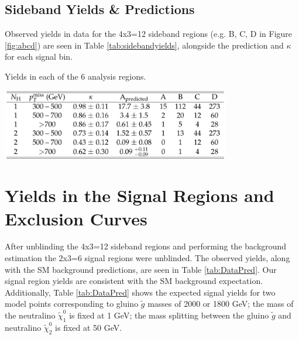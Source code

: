 \subsection{Sideband Yields \& Predictions}

Observed yields in data for the 4x3=12 sideband regions (e.g. B, C, D in Figure \ref{fig:abcd}) are seen in Table \ref{tab:sidebandyields}, alongside the prediction and $\kappa$ for each signal bin.

\begin{table}[htbp]
\centering
\caption{Yields in each of the 6 analysis regions.}
\includegraphics[width=0.75\textwidth]{figs/SUS17006/CMS-SUS-17-006_Table-aux_001.pdf}
\label{tab:sidebandyields}
\end{table}



\section{Yields in the Signal Regions and Exclusion Curves}
\label{sec:results}

After unblinding the 4x3=12 sideband regions and performing the background estimation the 2x3=6 signal regions were unblinded. The observed yields, along with the SM background predictions, are seen in Table \ref{tab:DataPred}. Our signal region yields are consistent with the SM background expectation. Additionally, Table \ref{tab:DataPred} shows the expected signal yields for two model points corresponding to gluino $\tilde{g}$ masses of 2000 or 1800 GeV; the mass of the neutralino $\tilde{\chi}_{1}^{0}$ is fixed at 1 GeV; the mass splitting between the gluino $\tilde{g}$ and neutralino $\tilde{\chi}_{2}^{0}$ is fixed at 50 GeV.

